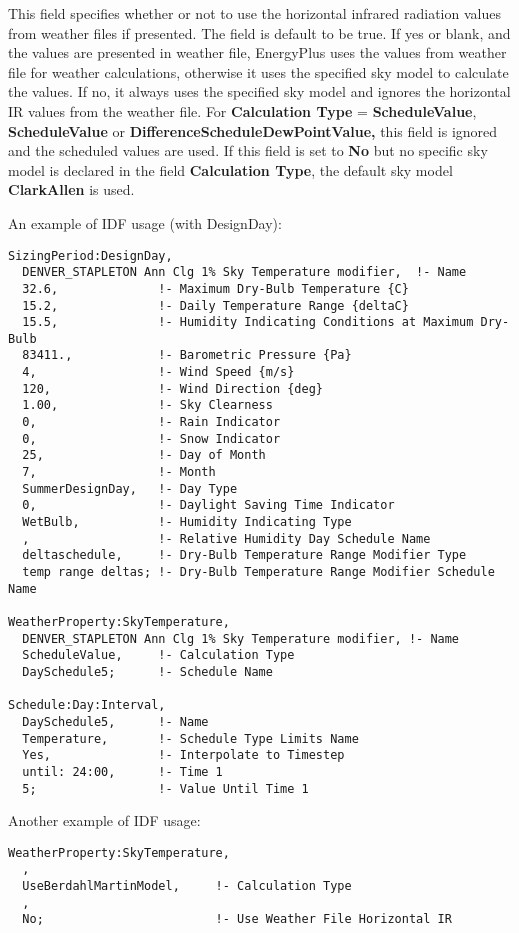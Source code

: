 This field specifies whether or not to use the horizontal infrared radiation values from weather files if presented. The field is default to be true. If yes or blank, and the values are presented in weather file, EnergyPlus uses the values from weather file for weather calculations, otherwise it uses the specified sky model to calculate the values. If no, it always uses the specified sky model and ignores the horizontal IR values from the weather file. For \textbf{Calculation Type} = \textbf{ScheduleValue}, \textbf{ScheduleValue} or \textbf{DifferenceScheduleDewPointValue,} this field is ignored and the scheduled values are used. If this field is set to \textbf{No} but no specific sky model is declared in the field \textbf{Calculation Type}, the default sky model \textbf{ClarkAllen} is used.

An example of IDF usage (with DesignDay):

\begin{lstlisting}
SizingPeriod:DesignDay,
  DENVER_STAPLETON Ann Clg 1% Sky Temperature modifier,  !- Name
  32.6,              !- Maximum Dry-Bulb Temperature {C}
  15.2,              !- Daily Temperature Range {deltaC}
  15.5,              !- Humidity Indicating Conditions at Maximum Dry-Bulb
  83411.,            !- Barometric Pressure {Pa}
  4,                 !- Wind Speed {m/s}
  120,               !- Wind Direction {deg}
  1.00,              !- Sky Clearness
  0,                 !- Rain Indicator
  0,                 !- Snow Indicator
  25,                !- Day of Month
  7,                 !- Month
  SummerDesignDay,   !- Day Type
  0,                 !- Daylight Saving Time Indicator
  WetBulb,           !- Humidity Indicating Type
  ,                  !- Relative Humidity Day Schedule Name
  deltaschedule,     !- Dry-Bulb Temperature Range Modifier Type
  temp range deltas; !- Dry-Bulb Temperature Range Modifier Schedule Name

WeatherProperty:SkyTemperature,
  DENVER_STAPLETON Ann Clg 1% Sky Temperature modifier, !- Name
  ScheduleValue,     !- Calculation Type
  DaySchedule5;      !- Schedule Name

Schedule:Day:Interval,
  DaySchedule5,      !- Name
  Temperature,       !- Schedule Type Limits Name
  Yes,               !- Interpolate to Timestep
  until: 24:00,      !- Time 1
  5;                 !- Value Until Time 1
\end{lstlisting}

Another example of IDF usage:

\begin{lstlisting}
WeatherProperty:SkyTemperature,
  ,
  UseBerdahlMartinModel,     !- Calculation Type
  ,
  No;                        !- Use Weather File Horizontal IR
\end{lstlisting}


